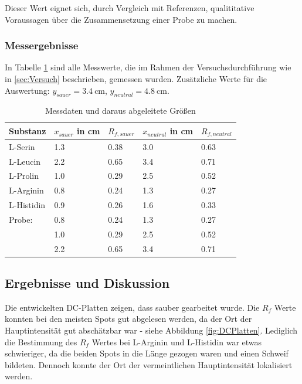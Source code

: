 \documentclass{article}
\begin{document}
        Dieser Wert eignet sich, durch Vergleich mit Referenzen, qualititative Voraussagen über die Zusammensetzung einer Probe zu machen.
        
      \subsubsection{Messergebnisse}
    
        In Tabelle \ref{tab:Messdaten} sind alle Messwerte, die im Rahmen der Versuchsdurchführung wie in \ref{sec:Versuch} beschrieben, gemessen wurden. Zusätzliche Werte für die Auswertung: $y_{sauer}=\SI[mode=text]{3.4}{\centi\meter}$, $y_{neutral}=\SI[mode=text]{4.8}{\centi\meter}$.
      
        \begin{table}[H]
          \centering
          \caption[Messdaten der Dünnschichtchromatographie und daraus abgeleitete Größen, Quelle: Autor]{Messdaten und daraus abgeleitete Größen}
          \label{tab:Messdaten}
            \begin{tabular}{@{}l|ll|ll@{}}
              \toprule
               Substanz & $x_{sauer}$ in \si{\centi\meter} & $R_{f,sauer}$ & $x_{neutral}$ in \si{\centi\meter} & $R_{f,neutral}$ \\ \midrule
               L-Serin & 1.3 & 0.38 & 3.0 & 0.63 \\
               L-Leucin & 2.2 & 0.65 & 3.4 & 0.71 \\
               L-Prolin & 1.0 & 0.29 & 2.5 & 0.52 \\
               L-Arginin & 0.8 & 0.24 & 1.3 & 0.27 \\
               L-Histidin & 0.9 & 0.26 & 1.6 & 0.33 \\ \midrule
               Probe: & 0.8 & 0.24 & 1.3 & 0.27 \\
                      & 1.0 & 0.29 & 2.5 & 0.52 \\
                      & 2.2 & 0.65 & 3.4 & 0.71 \\ \bottomrule
            \end{tabular}
         \end{table}      
      
    \subsection{Ergebnisse und Diskussion}
    
      Die entwickelten DC-Platten zeigen, dass sauber gearbeitet wurde. Die $R_{f}$ Werte konnten bei den meisten Spots gut abgelesen werden, da der Ort der Hauptintensität gut abschätzbar war - siehe Abbildung \ref{fig:DCPlatten}. Lediglich die Bestimmung des $R_{f}$ Wertes bei L-Arginin und L-Histidin war etwas schwieriger, da die beiden Spots in die Länge gezogen waren und einen Schweif bildeten. Dennoch konnte der Ort der vermeintlichen Hauptintensität lokalisiert werden. \\
      
\end{document}
